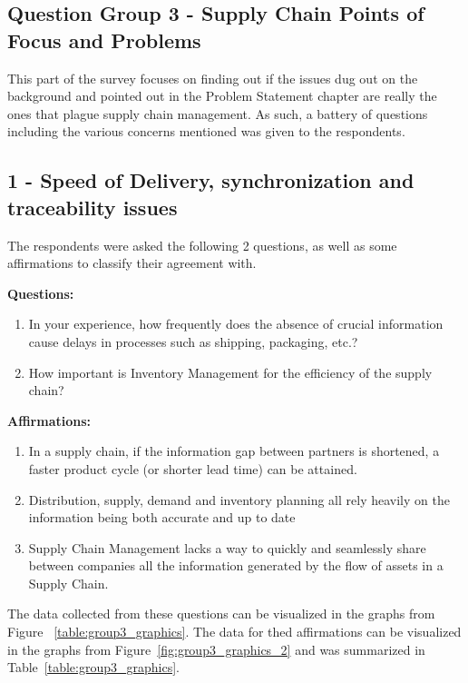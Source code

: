 \subsection{Question Group 3 - Supply Chain Points of Focus and Problems}
\label{sec-supplychainissues}
This part of the survey focuses on finding out if the issues dug out on the background and pointed out in the Problem Statement chapter are really the ones that plague supply chain management. As such, a battery of questions including the various concerns mentioned was given to the respondents.

\subsection*{1 - Speed of Delivery, synchronization and traceability issues}

The respondents were asked the following 2 questions, as well as some affirmations to classify their agreement with.

\par\textbf{Questions:}
\begin{enumerate}
  \item In your experience, how frequently does the absence of crucial information cause delays in processes such as shipping, packaging, etc.?
  \item How important is Inventory Management for the efficiency of the supply chain?
\end{enumerate}

\par\textbf{Affirmations:}
\begin{enumerate}

\item In a supply chain, if the information gap between partners is shortened, a faster product cycle (or shorter lead time) can be attained.
\item Distribution, supply, demand and inventory planning all rely heavily on the information being both accurate and up to date

\item Supply Chain Management lacks a way to quickly and seamlessly share between companies all the information generated by the flow of assets in a Supply Chain.
\end{enumerate}

The data collected from these questions can be visualized in the graphs from Figure ~\ref{table:group3_graphics}. The data for thed affirmations can be visualized in the graphs from Figure~\ref{fig:group3_graphics_2} and was summarized in Table~\ref{table:group3_graphics}.

